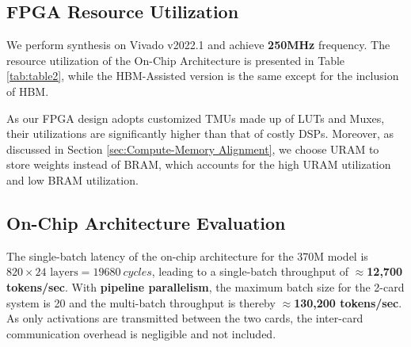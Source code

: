 \subsection{FPGA Resource Utilization}
\vspace{-0.5mm}
We perform synthesis on Vivado v2022.1 and achieve \textbf{250MHz} frequency. The resource utilization of the On-Chip Architecture is presented in Table \ref{tab:table2}, while the HBM-Assisted version is the same except for the inclusion of HBM.
\begin{table}[h]
    \centering
    \vspace{-3mm}
    \caption{\textit{TerEffic} FPGA Resource Utilization}
    \label{tab:table2} 
    \vspace{-1mm}
    \vspace{-3mm}
\end{table}

As our FPGA design adopts customized TMUs made up of LUTs and Muxes, their utilizations are significantly higher than that of costly DSPs. Moreover, as discussed in Section \ref{sec:Compute-Memory Alignment}, we choose URAM to store weights instead of BRAM, which accounts for the high URAM utilization and low BRAM utilization.


\subsection{On-Chip Architecture Evaluation}
The single-batch latency of the on-chip architecture for the 370M model is $820\times 24 \text{ layers} = 19680 \ cycles$, leading to a single-batch throughput of \textbf{$\approx$12,700 tokens/sec}. With \textbf{pipeline parallelism}, the maximum batch size for the 2-card system is 20 and the multi-batch throughput is thereby \textbf{$\approx$130,200 tokens/sec}. As only activations are transmitted between the two cards, the inter-card communication overhead is negligible and not included.

